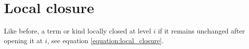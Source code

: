 \documentclass[logo,bsc,singlespacing,parskip,online]{infthesis}
\renewenvironment{code}{\mintedcopy[breaklines,breaksymbolleft=\;]{agda}}{\endmintedcopy}
\begin{document}
\begin{comment}
However, I may use a different approach at some point and need to use closing. Just in case, I'll
define it here.
\begin{code}
  ty-ty[_←—_]_ : ℕ → List Char → Type → Type
  ty-ty[ i ←— x ] ‵ℕ = ‵ℕ
  ty-ty[ i ←— x ] (t-fr y) with x ≟lchar y
  ... | yes _ = t-# i
  ... | no  _ = t-fr y
  ty-ty[ i ←— x ] (t-# n) = t-# n
  ty-ty[ i ←— x ] (A ⇒ B) = (ty-ty[ i ←— x ] A) ⇒ (ty-ty[ i ←— x ] B)
  ty-ty[ i ←— x ] t-∀ A = t-∀ (ty-ty[ i ←— x ] A)

  ty-tm[_←—_]_ : ℕ → List Char → Term → Term
  ty-tm[ i ←— x ] (fr y) = fr y
  ty-tm[ i ←— x ] (# n) = # n
  ty-tm[ i ←— x ] (ƛ A , L) = ƛ (ty-ty[ i ←— x ] A) , (ty-tm[ i ←— x ] L)
  ty-tm[ i ←— x ] (L · M) = (ty-tm[ i ←— x ] L) · (ty-tm[ i ←— x ] M)
  ty-tm[ i ←— x ] (Λ L) = Λ (ty-tm[ suc i ←— x ] L)
  ty-tm[ i ←— x ] (L [ A ]) = (ty-tm[ i ←— x ] L) [ (ty-ty[ i ←— x ] A) ]
  ty-tm[ i ←— x ] ‵zero = ‵zero
  ty-tm[ i ←— x ] (‵suc L) = ‵suc ty-tm[ i ←— x ] L

  tm-tm[_←—_]_ : ℕ → List Char → Term → Term
  tm-tm[ i ←— x ] (fr y) with x ≟lchar y
  ... | yes _ = # i
  ... | no  _ = fr y
  tm-tm[ i ←— x ] (# n) = # n
  tm-tm[ i ←— x ] (ƛ A , L) = ƛ A , tm-tm[ (suc i) ←— x ] L
  tm-tm[ i ←— x ] (L · M) = (tm-tm[ i ←— x ] L) · (tm-tm[ i ←— x ] M)
  tm-tm[ i ←— x ] (Λ L) = Λ (tm-tm[ i ←— x ] L)
  tm-tm[ i ←— x ] (L [ A ]) = (tm-tm[ i ←— x ] L) [ A ]
  tm-tm[ i ←— x ] ‵zero = ‵zero
  tm-tm[ i ←— x ] (‵suc L) = ‵suc tm-tm[ i ←— x ] L
\end{code}
\end{comment}

\section{Local closure}
\label{chapter4:local_closure}
Like before, a term or kind locally closed at level $i$ if it remains unchanged after opening it at
$i$, see equation \ref{equation:local_closure}.

\begin{comment}
\begin{code}
  _≻k_ : ℕ → Type → Set
  i ≻k A = (j : ℕ) ⦃ _ : j ≥ i ⦄ → И a , (ty-ty[ j —→ a ] A ≡ A)

  _≻t_ : ℕ → Term → Set
  i ≻t L = (j : ℕ) ⦃ _ : j ≥ i ⦄ → И a , (tm-tm[ j —→ a ] L ≡ L)

  K-LocallyClosed : Type → Set
  K-LocallyClosed A = 0 ≻k A

  T-LocallyClosed : Term → Set
  T-LocallyClosed T = 0 ≻t T
\end{code}
\end{comment}
\end{document}
